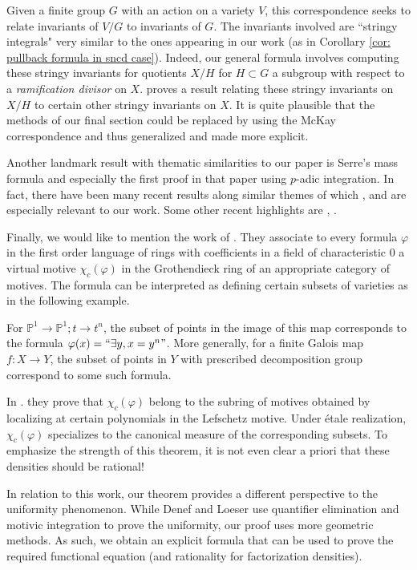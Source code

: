 \documentclass[10pt]{article}
\theoremstyle{plain}
\theoremstyle{definition}
\numberwithin{equation}{section}
\begin{document}
Given a finite group $G$ with an action on a variety $V$, this correspondence seeks to relate invariants of $V/G$ to invariants of $G$. The invariants involved are ``stringy integrals" very similar to the ones appearing in our work (as in Corollary \ref{cor: pullback formula in sncd case}). Indeed, our general formula involves computing these stringy invariants for quotients $X/H$ for $H \subset G$ a subgroup with respect to a \emph{ramification divisor} on $X$. \cite[Theorem 1.1]{yasuda2017wild} proves a result relating these stringy invariants on $X/H$ to certain other stringy invariants on $X$. It is quite plausible that the methods of our final section could be replaced by using the McKay correspondence and thus generalized and made more explicit.

Another landmark result with thematic similarities to our paper is Serre's mass formula \cite{serre1978formule} and especially the first proof in that paper using $p$-adic integration. In fact, there have been many recent results along similar themes of which \cite{caruso2022zeroes}, \cite{bhargava2007mass} and \cite{yasuda2017wild} are especially relevant to our work. Some other recent highlights are \cite{groechenig2020geometric}, \cite{groechenig2020mirror}.

Finally, we would like to mention the work of \cite{denef_loeser_2000}. They associate to every formula $\varphi$ in the first order language of rings with coefficients in a field of characteristic $0$ a virtual motive $\chi_c(\varphi)$ in the Grothendieck ring of an appropriate category of motives. The formula can be interpreted as defining certain subsets of varieties as in the following example.

For $\mathbb P^1 \to \mathbb P^1; t \to t^n$, the subset of points in the image of this map corresponds to the formula $\varphi(x) = ``\exists y, x = y^n"$. More generally, for a finite Galois map $f: X \to Y$, the subset of points in $Y$ with prescribed decomposition group correspond to some such formula.

In \cite[Corollary 7.1.2]{denef_loeser_2000}. they prove that $\chi_c(\varphi)$ belong to the subring of motives obtained by localizing at certain polynomials in the Lefschetz motive. Under \'etale realization, $\chi_c(\varphi)$ specializes to the canonical measure of the corresponding subsets. To emphasize the strength of this theorem, it is not even clear a priori that these densities should be rational!

In relation to this work, our theorem provides a different perspective to the uniformity phenomenon. While Denef and Loeser use quantifier elimination and motivic integration to prove the uniformity, our proof uses more geometric methods. As such, we obtain an explicit formula that can be used to prove the required functional equation (and rationality for factorization densities).
     
\end{document}
